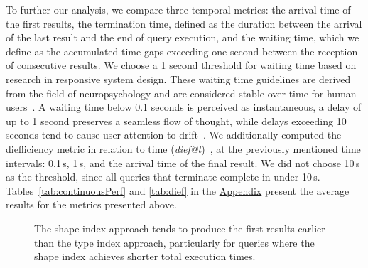  

To further our analysis, we compare three temporal metrics: the arrival time of the first results, the termination time, defined as the duration between the arrival of the last result and the end of query execution, and the waiting time, which we define as the accumulated time gaps exceeding one second between the reception of consecutive results.
We choose a 1 second threshold for waiting time based on research in responsive system design.
These waiting time guidelines are derived from the field of neuropsychology and are considered stable over time for human users~\cite{uxtigersNeedSpeed, Nielsen1993}.
A waiting time below 0.1 seconds is perceived as instantaneous, a delay of up to 1 second preserves a seamless flow of thought, while delays exceeding 10 seconds tend to cause user attention to drift~\cite{Nielsen1993}.
We additionally computed the diefficiency metric in relation to time (\textit{dief@t})~\cite{Acosta2017}, at the previously mentioned time intervals: 0.1\,s, 1\,s, and the arrival time of the final result.
We did not choose 10\,s as the threshold, since all queries that terminate complete in under 10\,s.
Tables~\ref{tab:continuousPerf} and \ref{tab:dief} in the \hyperref[sec:appendix]{Appendix} present the average results for the metrics presented above.


\begin{figure}
    \centering
    
    \caption{The shape index approach tends to produce the first results earlier than the type index approach, particularly for queries where the shape index achieves shorter total execution times.}
    \label{fig:first_res}
\end{figure}

